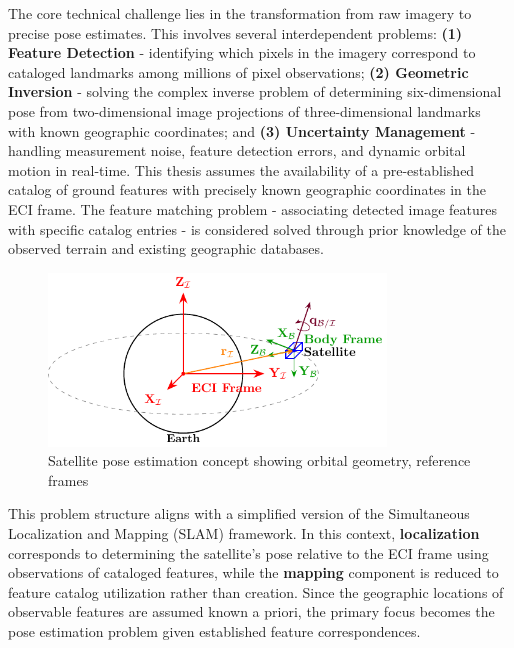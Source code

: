 \noindent The core technical challenge lies in the transformation from raw imagery to precise pose estimates. This involves several 
interdependent problems: \textbf{(1) Feature Detection} - identifying which pixels in the imagery correspond to cataloged 
landmarks among millions of pixel observations; \textbf{(2) Geometric Inversion} - solving the complex inverse problem of 
determining six-dimensional pose from two-dimensional image projections of three-dimensional landmarks with known geographic 
coordinates; and \textbf{(3) Uncertainty Management} - handling measurement noise, feature detection errors, and dynamic orbital 
motion in real-time. This thesis assumes the availability of a pre-established catalog of ground features with precisely 
known geographic coordinates in the ECI frame. The feature matching problem - associating detected image features with specific 
catalog entries - is considered solved through prior knowledge of the observed terrain and existing geographic databases.
\vspace{0.5cm}

\begin{figure}[htbp]
    \centering
    \includegraphics[width=0.8\textwidth]{figures/Figure1.pdf}
    \caption{Satellite pose estimation concept showing orbital geometry, reference frames}
    \label{fig:satellite_concept}
\end{figure}

This problem structure aligns with a simplified version of the Simultaneous Localization and Mapping (SLAM) framework. 
In this context, \textbf{localization} corresponds to determining the satellite's pose relative to the ECI frame using 
observations of cataloged features, while the \textbf{mapping} component is reduced to feature catalog utilization rather 
than creation. Since the geographic locations of observable features are assumed known a priori, the primary focus becomes the 
pose estimation problem given established feature correspondences.
\vspace{0.5cm}

